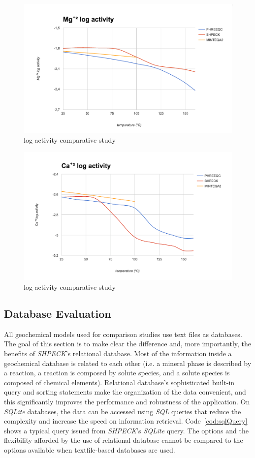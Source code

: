 \documentclass[preprint,12pt,3p]{elsarticle}
\begin{document}
\begin{figure}[ht!]
\centering
\includegraphics[width=140mm]{mg+2.png}
\caption{ log activity comparative study}
\label{fig:mg+2}
\end{figure}

\begin{figure}[ht!]
\centering
\includegraphics[width=140mm]{ca+2.png}
\caption{ log activity comparative study}
\label{fig:ca+2}
\end{figure}

\subsection{Database Evaluation}
All geochemical models used for comparison studies use text files as databases. The goal of this section is to make clear the difference and, more importantly, the benefits of \emph{SHPECK}’s relational database. Most of the information inside a geochemical database is related to each other (i.e. a mineral phase is described by a reaction, a reaction is composed by solute species, and a solute species is composed of chemical elements). Relational database’s sophisticated built-in query and sorting statements make the organization of the data convenient, and this significantly improves the performance and robustness of the application. On \emph{SQLite} databases, the data can be accessed using \emph{SQL} queries that reduce the complexity and increase the speed on information retrieval. Code~\ref{cod:sqlQuery} shows a typical query issued from \emph{SHPECK}’s \emph{SQLite} query. The options and the flexibility afforded by the use of relational database cannot be compared to the options available when textfile-based databases are used.
\end{document}
